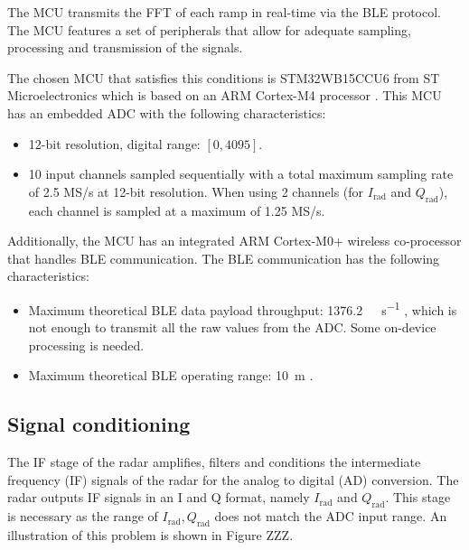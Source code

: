 The MCU transmits the FFT of each ramp in real-time via the BLE protocol. The MCU features a set of peripherals that allow for adequate sampling, processing and transmission of the signals.

The chosen MCU that satisfies this conditions is STM32WB15CCU6 from ST Microelectronics which is based on an ARM Cortex-M4 processor \cite{STMicroelectronics2022}. This MCU has an embedded ADC with the following characteristics:
\begin{itemize}
	\item 12-bit resolution, digital range: $[0, 4095]$.
	\item 10 input channels sampled sequentially with a total maximum sampling rate of 2.5 MS/s at 12-bit resolution. When using 2 channels (for $I_\mathrm{rad}$ and $Q_\mathrm{rad}$), each channel is sampled at a maximum of 1.25 MS/s.
\end{itemize}

Additionally, the MCU has an integrated ARM Cortex-M0+ wireless co-processor that handles BLE communication. The BLE communication has the following characteristics:
\begin{itemize}
	\item Maximum theoretical BLE data payload throughput: \SI{1376.2}{\kilo\bit\per\second} \cite{NordicSemiconductor2019,Bluetooth52},  which is not enough to transmit all the raw values from the ADC. Some on-device processing is needed.
	\item Maximum theoretical BLE operating range: \SI{10}{\meter} \cite{Bluetooth52}.
\end{itemize}
\subsection{Signal conditioning}

The IF stage of the radar amplifies, filters and conditions the intermediate frequency (IF) signals of the radar for the analog to digital (AD) conversion. The radar outputs IF signals in an I and Q format, namely $I_\mathrm{rad}$ and $Q_\mathrm{rad}$. This stage is necessary as the range of $I_\mathrm{rad}, Q_\mathrm{rad}$ does not match the ADC input range. An illustration of this problem is shown in Figure ZZZ.


